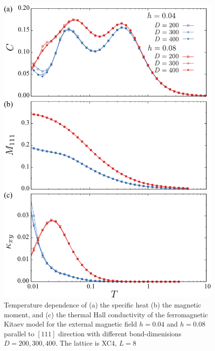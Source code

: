 \documentclass[reprint,amsmath,amssymb,aps,prx]{revtex4-2}
\begin{document}
\begin{figure}
  \begin{center}
    \includegraphics[width=0.9\linewidth]{plot_CMk_XC4.pdf}
  \end{center}
  \caption{Temperature dependence of (a) the specific heat (b) the magnetic moment, and (c) the thermal Hall conductivity of the ferromagnetic Kitaev model for the external magnetic field $h=0.04$ and $h=0.08$ parallel to $[111]$ direction with different bond-dimenisions $D=200, 300, 400$. The lattice is XC4, $L=8$}
  \label{fig:CMk_XC4}
\end{figure}
\end{document}
